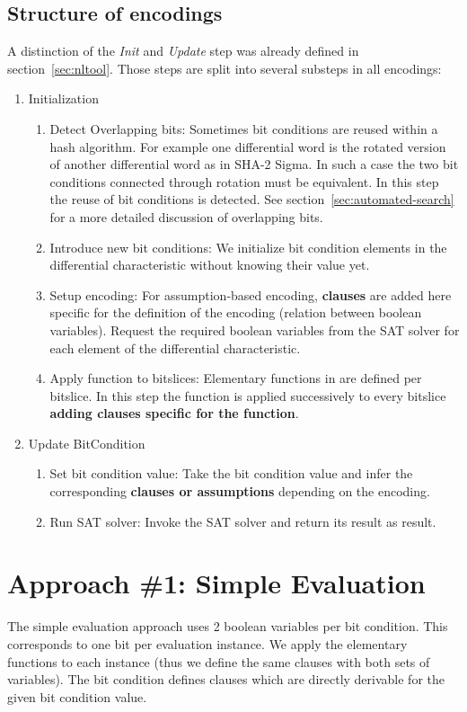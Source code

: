 \subsection{Structure of encodings}
\label{sec:encoding-structure}
%
A distinction of the \emph{Init} and \emph{Update} step was already defined in section~\ref{sec:nltool}. Those steps are split into several substeps in all encodings:
\begin{enumerate}
  \item Initialization
    \begin{enumerate}
      \item Detect Overlapping bits: Sometimes bit conditions are reused within a hash algorithm. For example one differential word is the rotated version of another differential word as in SHA-2 Sigma. In such a case the two bit conditions connected through rotation must be equivalent. In this step the reuse of bit conditions is detected. See section~\ref{sec:automated-search} for a more detailed discussion of overlapping bits.
      \item Introduce new bit conditions: We initialize bit condition elements in the differential characteristic without knowing their value yet.
      \item Setup encoding: For assumption-based encoding, \textbf{clauses} are added here specific for the definition of the encoding (relation between boolean variables). Request the required boolean variables from the SAT solver for each element of the differential characteristic.
      \item Apply function to bitslices: Elementary functions in \nltool{} are defined per bitslice. In this step the function is applied successively to every bitslice \textbf{adding clauses specific for the function}.
    \end{enumerate}
  \item Update BitCondition
    \begin{enumerate}
      \item Set bit condition value: Take the bit condition value and infer the corresponding \textbf{clauses or assumptions} depending on the encoding.
      \item Run SAT solver: Invoke the SAT solver and return its result as result.
    \end{enumerate}
\end{enumerate}

\newpage
\section{Approach \#1: Simple Evaluation}
\label{sec:encoding:simple-evaluation}
%
The simple evaluation approach uses 2 boolean variables per bit condition. This corresponds to one bit per evaluation instance. We apply the elementary functions to each instance (thus we define the same clauses with both sets of variables). The bit condition defines clauses which are directly derivable for the given bit condition value.

